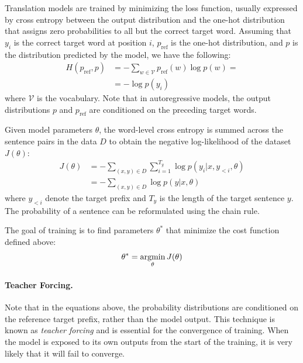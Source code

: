 Translation models are trained by minimizing the loss function, usually
expressed by cross entropy between the output distribution and the one-hot
distribution that assigns zero probabilities to all but the correct target
word. Assuming that $y_i$ is the correct target word at position $i$,
$p_{\text{ref}}$ is the one-hot distribution, and $p$ is the distribution
predicted by the model, we have the following:
%
\begin{equation}
  \begin{split}
    H(p_{\text{ref}}, p) &=  - \sum_{w \in \mathcal{V}} p_{\text{ref}}(w) \log p(w) = \\
    &=  - \log p(y_i)
  \end{split}
\end{equation}
%
where $\mathcal{V}$ is the vocabulary. Note that in autoregressive models, the
output distributions $p$ and $p_{\text{ref}}$ are conditioned on the preceding
target words.

Given model parameters $\theta$, the word-level cross entropy is summed across
the sentence pairs in the data $D$ to obtain the negative log-likelihood of the
dataset $J(\theta)$:
%
\begin{equation}
  \begin{split}
  J(\theta) &= - \sum_{(x, y) \in D} \sum_{i = 1}^{T_y} \log p(y_i | x, y_{<i}, \theta) \\
  &= - \sum_{(x, y) \in D} \log p(y | x, \theta)
  \end{split} \label{eq:loss}
\end{equation}
%
where $y_{<i}$ denote the target prefix and $T_{y}$ is the length of the target
sentence $y$. The probability of a sentence can be reformulated using the chain
rule.

The goal of training is to find parameters $\theta^*$ that minimize the cost
function defined above:
\begin{equation}
  \theta^* = \operatorname*{argmin}_{\theta}J(\theta)
\end{equation}


\paragraph{Teacher Forcing.}
Note that in the equations above, the probability distributions are conditioned
on the reference target prefix, rather than the model output. This technique is
known as \emph{teacher forcing} and is essential for the convergence of
training. When the model is exposed to its own outputs from the start of the
training, it is very likely that it will fail to converge.

